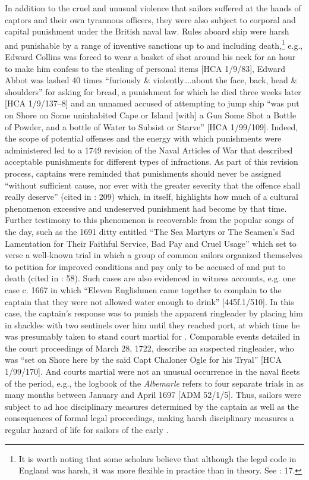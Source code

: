   In addition to the cruel and unusual violence that sailors suffered at the hands of captors and their own tyrannous officers, they were also subject to corporal and capital punishment under the British naval law. Rules aboard ship were harsh and punishable by a range of inventive sanctions up to and including death,\footnote{It is worth noting that some scholars believe that although the legal code in England was harsh, it was more flexible in practice than in theory. See \citealt{Fury2015}: 17.} e.g., Edward Collins was forced to wear a basket of shot around his neck for an hour to make him confess to the stealing of personal items [HCA 1/9/83], Edward Abbot was lashed 40 times “furiously \& violently….about the face, back, head \& shoulders” for asking for bread, a punishment for which he died three weeks later [HCA 1/9/137–8] and an unnamed  accused of attempting to jump ship “was put on Shore on Some uninhabited Cape or Island [with] a Gun Some Shot a Bottle of Powder, and a bottle of Water to Subsist or Starve” [HCA 1/99/109]. Indeed, the scope of potential offenses and the energy with which punishments were administered led to a 1749 revision of the Naval Articles of War that described acceptable punishments for different types of infractions. As part of this revision process, captains were reminded that punishments should never be assigned “without sufficient cause, nor ever with the greater severity that the offence shall really deserve” (cited in \citealt{AdkinsAdkins2008}: 209) which, in itself, highlights how much of a cultural phenomenon excessive and undeserved punishment had become by that time. Further testimony to this phenomenon is recoverable from the popular songs of the day, such as the 1691 ditty entitled “The Sea Martyrs or The Seamen’s Sad Lamentation for Their Faithful Service, Bad Pay and Cruel Usage” which set to verse a well-known trial in which a group of common sailors organized themselves to petition for improved conditions and pay only to be accused of  and put to death (cited in \citealt{Palmer1986}: 58). Such cases are also evidenced in witness accounts, e.g. one case c. 1667 in which “Eleven Englishmen came together to complain to the captain that they were not allowed water enough to drink” [445f.1/510]. In this case, the captain’s response was to punish the apparent ringleader by placing him in shackles with two sentinels over him until they reached port, at which time he was presumably taken to stand court martial for . Comparable events detailed in the court proceedings of March 28, 1722, describe an suspected ringleader, who was “set on Shore here by the said Capt Chaloner Ogle for his Tryal” [HCA 1/99/170]. And courts martial were not an unusual occurrence in the naval fleets of the period, e.g., the logbook of the \textit{Albemarle} refers to four separate trials in as many months between  January and April 1697 [ADM 52/1/5]. Thus, sailors were subject to ad hoc disciplinary measures determined by the captain as well as the consequences of formal legal proceedings, making harsh disciplinary measures a regular hazard of life for sailors of the early .

